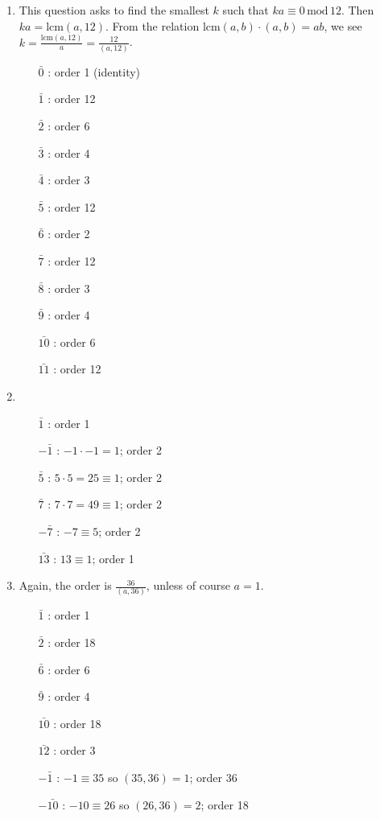 \documentclass[]{article}
\newcommand{\md}{\,\text{mod}\,}
\begin{document}
\begin{enumerate}
\item This question asks to find the smallest $k$ such that $ka \equiv 0\md{12}$. Then $ka = \text{lcm}(a,12)$. From the relation $\text{lcm}(a,b) \cdot (a,b) = ab$, we see $k = \frac{\text{lcm}(a,12)}{a} = \frac{12}{(a,12)}$.\begin{enumerate}
\item[$\bar{0}$]: order 1 (identity)
\item[$\bar{1}$]: order 12
\item[$\bar{2}$]: order 6
\item[$\bar{3}$]: order 4
\item[$\bar{4}$]: order 3
\item[$\bar{5}$]: order 12
\item[$\bar{6}$]: order 2
\item[$\bar{7}$]: order 12
\item[$\bar{8}$]: order 3
\item[$\bar{9}$]: order 4
\item[$\bar{10}$]: order 6
\item[$\bar{11}$]: order 12
\end{enumerate}
\item \begin{enumerate}
\item[$\bar{1}$]: order 1
\item[$-\bar{1}$]: $-1\cdot -1 = 1$; order 2
\item[$\bar{5}$]: $5\cdot 5 = 25 \equiv 1$; order 2
\item[$\bar{7}$]: $7\cdot 7 = 49 \equiv 1$; order 2
\item[$-\bar{7}$]: $-7 \equiv 5$; order 2
\item[$\bar{13}$]: $13 \equiv 1$; order 1
\end{enumerate}
\item Again, the order is $\frac{36}{(a,36)}$, unless of course $a=1$.\begin{enumerate}
\item[$\bar{1}$]: order 1
\item[$\bar{2}$]: order 18
\item[$\bar{6}$]: order 6
\item[$\bar{9}$]: order 4
\item[$\bar{10}$]: order 18
\item[$\bar{12}$]: order 3
\item[$-\bar{1}$]: $-1 \equiv 35$ so $(35,36) = 1$; order 36
\item[$-\bar{10}$]: $-10 \equiv 26$ so $(26,36) = 2$; order 18

\end{enumerate}
\end{enumerate}
\end{document}
